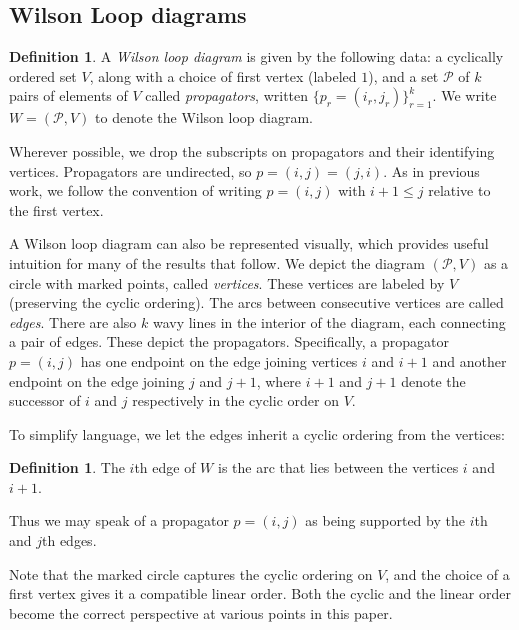 \documentclass[11pt]{article}
\newcommand{\cP}{\mathcal{P}}
\theoremstyle{remark}
\theoremstyle{definition}
\newtheorem{dfn}[thm]{Definition}
\begin{document}
\subsection{Wilson Loop diagrams}\label{section WLD background} 


\begin{dfn}\label{WLdfn}
A {\em Wilson loop diagram} is given by the following data: a cyclically ordered set $V$, along with a choice of first vertex (labeled $1$), and a set $\cP$ of $k$ pairs of elements of $V$ called {\em propagators}, written $\{p_r = (i_r, j_r)\}_{r=1}^k$. We write $W = (\cP,V)$ to denote the Wilson loop diagram. \end{dfn}

Wherever possible, we drop the subscripts on propagators and their identifying vertices. Propagators are undirected, so $p = (i,j) = (j,i)$. As in previous work, we follow the convention of writing $p = (i,j)$ with  $i +1 \leq j$ relative to the first vertex. 

A Wilson loop diagram can also be represented visually, which provides useful intuition for many of the results that follow. We depict the diagram $(\cP,V)$ as a circle with marked points, called {\em vertices}.  These vertices are labeled by $V$ (preserving the cyclic ordering). The arcs between consecutive vertices are called {\em edges}. There are also $k$ wavy lines in the interior of the diagram, each connecting a pair of edges.  These depict the propagators. Specifically, a propagator $p =(i,j)$ has one endpoint on the edge joining vertices $i$ and $i+1$ and another endpoint on the edge joining $j$ and $j+1$, where $i+1$ and $j+1$ denote the successor of $i$ and $j$ respectively in the cyclic order on $V$. 

To simplify language, we let the edges inherit a cyclic ordering from the vertices:

\begin{dfn}\label{def:edges}
The $i$th edge of $W$ is the arc that lies between the vertices $i$ and $i+1$.
\end{dfn}

Thus we may speak of a propagator $p = (i, j)$ as being supported by the $i$th and $j$th edges.

Note that the marked circle captures the cyclic ordering on $V$, and the choice of a first vertex gives it a compatible linear order. Both the cyclic and the linear order become the correct perspective at various points in this paper. 
\end{document}
